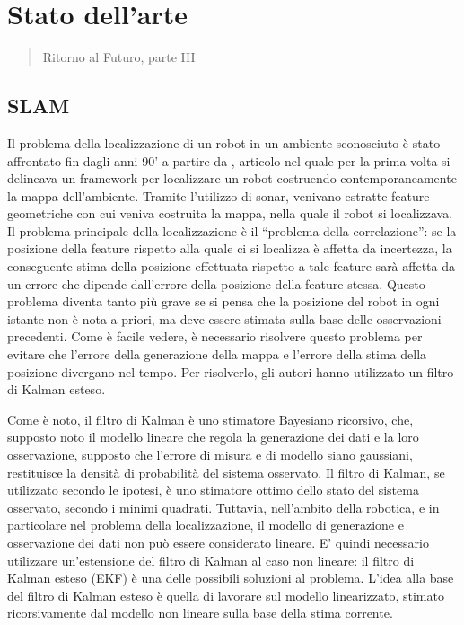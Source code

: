 \chapter{Stato dell'arte}
\label{capitolo2}
\thispagestyle{empty}

\begin{quotation}
{\footnotesize
{}
\begin{flushright}
Ritorno al Futuro, parte III
\end{flushright}
}
\end{quotation}
\vspace{0.5cm}

\section{SLAM}

Il problema della localizzazione di un robot in un ambiente sconosciuto è stato affrontato fin dagli anni 90' a partire da \cite{174711}, articolo nel quale per la prima volta si delineava un framework per localizzare un robot costruendo contemporaneamente la mappa dell'ambiente.
Tramite l'utilizzo di sonar, venivano estratte feature geometriche con cui veniva costruita la mappa, nella quale il robot si localizzava. 
Il problema principale della localizzazione è il ``problema della correlazione'': se la posizione della feature rispetto alla quale ci si localizza è affetta da incertezza, la conseguente stima della posizione effettuata rispetto a tale feature sarà affetta da un errore che dipende dall'errore della posizione della feature stessa. 
Questo problema diventa tanto più grave se si pensa che la posizione del robot in ogni istante non è nota a priori, ma deve essere stimata sulla base delle osservazioni precedenti. 
Come è facile vedere, è necessario risolvere questo problema per evitare che l'errore della generazione della mappa e l'errore della stima della posizione divergano nel tempo. 
Per risolverlo, gli autori hanno utilizzato un filtro di Kalman esteso.

Come è noto, il filtro di Kalman è uno stimatore Bayesiano ricorsivo, che, supposto noto il modello lineare che regola la generazione dei dati e la loro osservazione, supposto che l'errore di misura e di modello siano gaussiani, restituisce la densità di probabilità del sistema osservato. 
Il filtro di Kalman, se utilizzato secondo le ipotesi, è uno stimatore ottimo dello stato del sistema osservato, secondo i minimi quadrati.
Tuttavia, nell'ambito della robotica, e in particolare nel problema della localizzazione, il modello di generazione e osservazione dei dati non può essere considerato lineare.
E' quindi necessario utilizzare un'estensione del filtro di Kalman al caso non lineare: il filtro di Kalman esteso (EKF) è una delle possibili soluzioni al problema. 
L'idea alla base del filtro di Kalman esteso è quella di lavorare sul modello linearizzato, stimato ricorsivamente dal modello non lineare sulla base della stima corrente.

